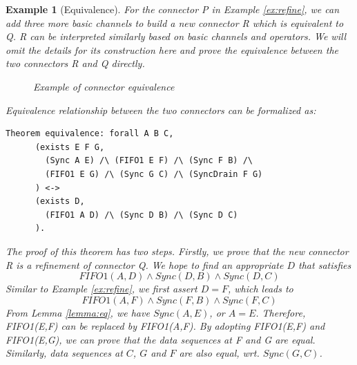 \documentclass[3p,times]{elsarticle}
\newtheorem{example}{Example}[section]
\begin{document}
\begin{example}[Equivalence]
For the connector \emph{P} in Example \ref{ex:refine}, we can add three more basic channels to build a new connector \emph{R} which is equivalent to \emph{Q}. \emph{R} can be interpreted similarly based on basic channels and operators. We will omit the details for its construction here and prove the equivalence between the two connectors \emph{R} and \emph{Q} directly.

\begin{figure}
\vspace{0cm}
\centering
{}
\caption{Example of connector equivalence}
\label{refine1}

\end{figure}

Equivalence relationship between the two connectors can be formalized as:
\begin{lstlisting}[language=coq]
    Theorem equivalence: forall A B C,
      (exists E F G,
        (Sync A E) /\ (FIFO1 E F) /\ (Sync F B) /\
        (FIFO1 E G) /\ (Sync G C) /\ (SyncDrain F G)
      ) <->
      (exists D,
        (FIFO1 A D) /\ (Sync D B) /\ (Sync D C)
      ).
\end{lstlisting}
The proof of this theorem has two steps. Firstly, we prove that the new connector \emph{R} is a refinement of connector \emph{Q}.
We hope to find an appropriate \emph{$D$} that satisfies
\[
FIFO1(A,D)\wedge Sync(D,B) \wedge Sync(D,C)
\]
Similar to Example \ref{ex:refine}, we first assert $D=F$, which leads to
\[
FIFO1(A,F) \land Sync(F,B) \wedge Sync(F,C)
\]
From Lemma \ref{lemma:eq}, we have $Sync(A,E)$, or $A=E$. Therefore, \emph{FIFO1(E,F)} can be replaced by \emph{FIFO1(A,F)}. By adopting \emph{FIFO1(E,F)} and \emph{FIFO1(E,G)}, we can prove that the data sequences at \emph{F} and \emph{G} are equal. Similarly, data sequences at $C$, $G$ and $F$ are also equal, wrt. $Sync(G,C)$.


\end{example}
\end{document}

